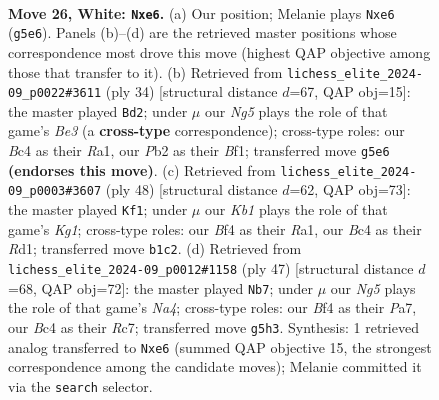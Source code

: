 \documentclass[11pt]{article}
\begin{document}
\clearpage

\begin{figure}[p]\centering
\begin{subfigure}{0.46\textwidth}\centering
\resizebox{\linewidth}{!}{%
\newchessgame
\chessboard[
  setfen={r1b3kr/8/p1n1p1p1/p3PpNp/n1B2B2/P5P1/1P3P1P/RK1R4 w - - 0 26},
  showmover=false,
  pgfstyle=straightmove, color=movearrow, markmove={g5-e6}
]}
\caption{}
\end{subfigure}\hfill
\begin{subfigure}{0.46\textwidth}\centering
\resizebox{\linewidth}{!}{%
\newchessgame
\chessboard[
  setfen={r1br2k1/pp3p1p/6p1/4p3/4PN2/2n1BP2/2P3PP/R3KB1R w K - 0 18},
  showmover=false,
  pgfstyle=straightmove, color=movearrow, markmove={e3-d2}
]}
\caption{}
\end{subfigure}
\\[4pt]
\begin{subfigure}{0.46\textwidth}\centering
\resizebox{\linewidth}{!}{%
\newchessgame
\chessboard[
  setfen={1r6/1ppr1kp1/p1nbp2p/P3p3/4P3/2P1BN1P/1P3PP1/R2R2K1 w - - 2 25},
  showmover=false,
  pgfstyle=straightmove, color=movearrow, markmove={g1-f1}
]}
\caption{}
\end{subfigure}\hfill
\begin{subfigure}{0.46\textwidth}\centering
\resizebox{\linewidth}{!}{%
\newchessgame
\chessboard[
  setfen={3r2k1/p1rb1p2/1p4pp/n2P1p2/2P5/2RB1NP1/P4P1P/2R3K1 b - - 0 24},
  showmover=false,
  pgfstyle=straightmove, color=movearrow, markmove={a5-b7}
]}
\caption{}
\end{subfigure}
\caption{\textbf{Move 26, White: \texttt{Nxe6}.} (a) Our position; Melanie plays \texttt{Nxe6} (\texttt{g5e6}). Panels (b)--(d) are the retrieved master positions whose correspondence most drove this move (highest QAP objective among those that transfer to it). (b) Retrieved from \texttt{lichess\_elite\_2024-09\_p0022\#3611} (ply 34) [structural distance $d$=67, QAP obj=15]: the master played \texttt{Bd2}; under $\mu$ our \emph{Ng5} plays the role of that game's \emph{Be3} (a \textbf{cross-type} correspondence); cross-type roles: our \emph{B}c4 as their \emph{R}a1, our \emph{P}b2 as their \emph{B}f1; transferred move \texttt{g5e6} \textbf{(endorses this move)}. (c) Retrieved from \texttt{lichess\_elite\_2024-09\_p0003\#3607} (ply 48) [structural distance $d$=62, QAP obj=73]: the master played \texttt{Kf1}; under $\mu$ our \emph{Kb1} plays the role of that game's \emph{Kg1}; cross-type roles: our \emph{B}f4 as their \emph{R}a1, our \emph{B}c4 as their \emph{R}d1; transferred move \texttt{b1c2}. (d) Retrieved from \texttt{lichess\_elite\_2024-09\_p0012\#1158} (ply 47) [structural distance $d$=68, QAP obj=72]: the master played \texttt{Nb7}; under $\mu$ our \emph{Ng5} plays the role of that game's \emph{Na4}; cross-type roles: our \emph{B}f4 as their \emph{P}a7, our \emph{B}c4 as their \emph{R}c7; transferred move \texttt{g5h3}. Synthesis: 1 retrieved analog transferred to \texttt{Nxe6} (summed QAP objective 15, the strongest correspondence among the candidate moves); Melanie committed it via the \texttt{search} selector.}
\label{fig:thought-m50}
\end{figure}
\end{document}
